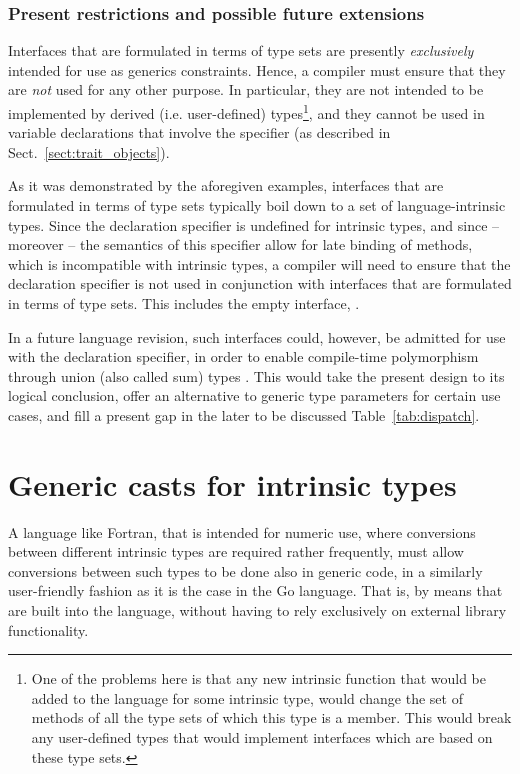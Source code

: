 \documentclass[11pt,oneside]{report}
\newcommand{\code}[1]{{\selectfont\ttfamily{#1}}}
\begin{document}
\subsubsection{Present restrictions and possible future extensions}
\label{sect:future_extensions}

Interfaces that are formulated in terms of type sets are presently
\emph{exclusively} intended for use as generics constraints. Hence, a
compiler must ensure that they are \emph{not} used for any other
purpose. In particular, they are not intended to be implemented by
derived (i.e. user-defined) types\footnote{One of the problems here is
that any new intrinsic function that would be added to the language
for some intrinsic type, would change the set of methods of all the
type sets of which this type is a member. This would break any
user-defined types that would implement interfaces which are based on
these type sets.}, and they cannot be used in variable declarations
that involve the \code{class} specifier (as described in
Sect.~\ref{sect:trait_objects}).

As it was demonstrated by the aforegiven examples, interfaces that are
formulated in terms of type sets typically boil down to a set of
language-intrinsic types. Since the \code{class} declaration specifier
is undefined for intrinsic types, and since -- moreover -- the
semantics of this specifier allow for late binding of methods, which
is incompatible with intrinsic types, a compiler will need to ensure
that the \code{class} declaration specifier is not used in conjunction
with interfaces that are formulated in terms of type sets. This
includes the empty interface, \code{IAnyType}.

In a future language revision, such interfaces could, however, be
admitted for use with the \code{type} declaration specifier, in order
to enable compile-time polymorphism through union (also called sum)
types \cite{Taylor_21,Pierce_91}. This would take the present design
to its logical conclusion, offer an alternative to generic type
parameters for certain use cases, and fill a present gap in the later
to be discussed Table~\ref{tab:dispatch}.


\section{Generic casts for intrinsic types}

A language like Fortran, that is intended for numeric use, where
conversions between different intrinsic types are required rather
frequently, must allow conversions between such types to be done also
in generic code, in a similarly user-friendly fashion as it is the
case in the Go language. That is, by means that are built into the
language, without having to rely exclusively on external library
functionality.
\end{document}
